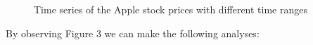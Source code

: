 \documentclass[11pt]{report}
\begin{document}
\begin{figure}[!htbp]
    \centering
    \qquad
    \caption{Time series of the Apple stock prices with different time ranges}%
    \label{fig:example}%
\end{figure}

\newpage
\noindent
By observing Figure 3 we can make the following analyses:
\end{document}
